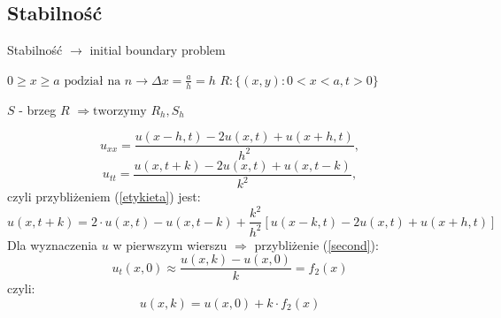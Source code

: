 
\subsection{Stabilność}
\begin{frame}{Stabilność}
$\to$ initial boundary problem

  \begin{block}{}
$0 \ge x \ge a \text{ podział na } n \to \Delta x = \frac{a}{h} = h$
$R: \{ (x,y): 0 < x< a, t > 0\}$
  \end{block}
$S$ - brzeg $R$
$\Rightarrow \text{tworzymy } R_h, S_h$


\end{frame}

\begin{frame}
$$u_{xx} = \frac{u(x-h,t)-2u(x,t)+u(x+h,t)}{h^2},$$
$$u_{tt} = \frac{u(x,t+k)-2u(x,t)+u(x,t-k)}{k^2},$$
czyli przybliżeniem (\ref{etykieta}) jest: \\
\begin{equation} \label{21} u(x,t+k) = 2\cdot u(x,t) - u(x,t-k) + \frac{k^2}{h^2}[u(x-k,t)-2u(x,t)+u(x+h,t)] \end{equation}
Dla wyznaczenia $u$ w pierwszym wierszu $\Rightarrow$ przybliżenie (\ref{second}):
$$u_t(x,0) \approx \frac{u(x,k) - u(x,0)}{k} = f_2(x)$$
czyli:
\begin{equation} \label{22} u(x,k) = u(x,0) + k \cdot f_2(x) \end{equation}
\end{frame}

